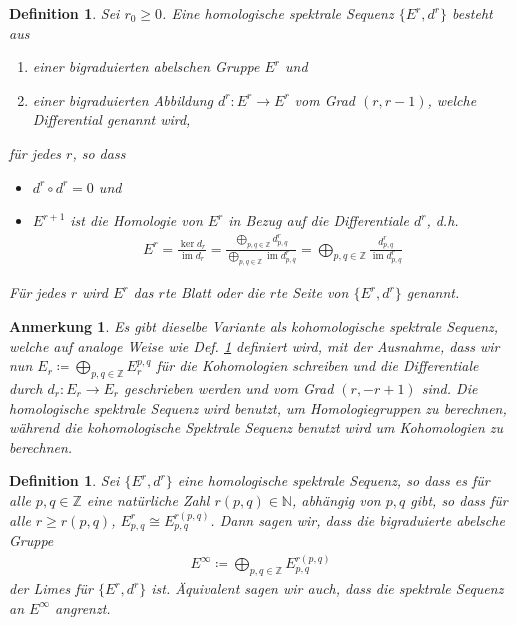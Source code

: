 \documentclass[12pt, hidelinks]{article}
\numberwithin{conj}{section}
\newtheorem{definition}[conj]{Definition}
\newtheorem{remark}[conj]{Anmerkung}
\newcommand{\Z}{\mathbb{Z}}
\newcommand{\ima}{\operatorname{im}}
\begin{document}
\begin{definition}
    \label{homologischeSpektraleSequenz}
    Sei $r_0 \geq 0$. Eine homologische spektrale Sequenz $\{E^r,d^r\}$ besteht aus
    \begin{enumerate}[nolistsep]
        \item einer bigraduierten abelschen Gruppe $E^r$ und
        \item einer bigraduierten Abbildung $d^r: E^r \to E^r$ vom Grad $(r,r-1)$, welche Differential genannt wird,
    \end{enumerate}
    für jedes $r$, so dass
    \begin{itemize}[nolistsep]
        \item $d^r \circ d^r = 0$ und
        \item $E^{r+1}$ ist die Homologie von $E^r$ in Bezug auf die Differentiale $d^r$, d.h.
        \begin{align}
            E^r = \frac{\ker d_r}{\ima d_r} = \frac{\bigoplus_{p,q \in \Z} d^r_{p,q}}{\bigoplus_{p,q \in \Z} \ima d^r_{p,q}} = \bigoplus_{p,q \in \Z} \frac{d^r_{p,q}}{\ima d^r_{p,q}}
        \end{align}
    \end{itemize}
    Für jedes $r$ wird $E^r$ das $r$te Blatt oder die $r$te Seite von $\{E^r,d^r\}$ genannt.
\end{definition}

\begin{remark}
    Es gibt dieselbe Variante als kohomologische spektrale Sequenz, welche auf analoge Weise wie Def. \ref{homologischeSpektraleSequenz} definiert wird, mit der Ausnahme, dass wir nun $E_r \coloneq \bigoplus_{p,q \in \Z} E^{p,q}_r$ für die Kohomologien schreiben und die Differentiale durch $d_r: E_r \to E_r$ geschrieben werden und vom Grad $(r,-r+1)$ sind. Die homologische spektrale Sequenz wird benutzt, um Homologiegruppen zu berechnen, während die kohomologische Spektrale Sequenz benutzt wird um Kohomologien zu berechnen.
\end{remark}

\begin{definition}
    Sei $\{E^r, d^r\}$ eine homologische spektrale Sequenz, so dass es für alle $p,q \in \Z$ eine natürliche Zahl $r(p,q) \in \mathbb{N}$, abhängig von $p,q$ gibt, so dass für alle $r \geq r(p,q)$, $E^r_{p,q} \cong E_{p,q}^{r(p,q)}$. Dann sagen wir, dass die bigraduierte abelsche Gruppe
    \begin{align}
        E^\infty \coloneq \bigoplus_{p,q \in \Z} E^{r(p,q)}_{p,q}
    \end{align}
    der Limes für $\{E^r, d^r\}$ ist. Äquivalent sagen wir auch, dass die spektrale Sequenz an $E^\infty$ angrenzt.
\end{definition}
\end{document}
